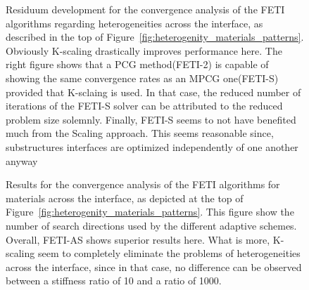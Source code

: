 \begin{figure}
  \begin{center}
    
    \caption[Study of heterogeneities across the interface: residua]{Residuum development for the convergence analysis of the FETI algorithms regarding heterogeneities across the interface, as described in the top of Figure~\ref{fig:heterogenity_materials_patterns}. Obviously K-scaling drastically improves performance here. The right figure shows that a PCG method(FETI-2) is capable of showing the same convergence rates as an MPCG one(FETI-S) provided that K-sclaing is used. In that case, the reduced number of iterations of the FETI-S solver can be attributed to the reduced problem size solemnly. Finally, FETI-S seems to not have benefited much from the Scaling approach. This seems reasonable since, substructures interfaces are optimized independently of one another anyway}
    \label{fig:heterogeneity_accross_residuum}
  \end{center}
\end{figure}

\begin{figure}
  \begin{center}
    
    \caption[Study of heterogeneities across the interface: \# search directions]{Results for the convergence analysis of the FETI algorithms for materials across the interface, as depicted at the top of Figure~\ref{fig:heterogenity_materials_patterns}. This figure show the number of search directions used by the different adaptive schemes. Overall, FETI-AS shows superior results here. What is more, K-scaling seem to completely eliminate the problems of heterogeneities across the interface, since in that case, no difference can be observed between a stiffness ratio of 10 and a ratio of 1000.}
    \label{fig:heterogeneity_accross_numsdir}
  \end{center}
\end{figure}









\FloatBarrier
